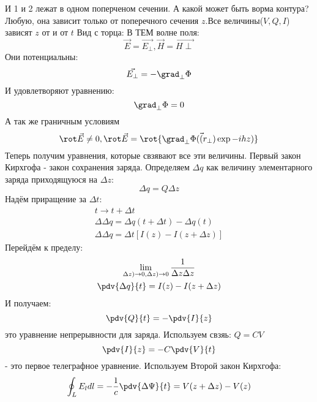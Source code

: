 И 1 и 2 лежат в одном поперченом сечении. А какой может быть ворма контура? Любую, она зависит только от поперечного сечения $z$.Все величины($V, Q, I$) зависят $z$ от и от $t$
%
Вид с торца:
%
В ТЕМ волне поля:
\begin{equation}
	\vec{E} = \vec{E_\perp}, \vec{H} = \vec{H\perp}
\end{equation}
%
Они потенциальны:
\begin{equation}
	\vec{E_\perp} = - \grad_\perp{\Phi}
\end{equation}
%
И удовлетворяют уравнению:
\begin{equation}
	\grad_\perp{\Phi} = 0
\end{equation}
А так же граничным условиям
\begin{equation}
	\rot\vec{E} \neq 0, \rot\vec{E} = \rot{\grad_\perp{\Phi(\vec(r_\perp)\exp{-i h z})}}
\end{equation}
Теперь получим уравнения, которые свзявают все эти величины.
%
Первый закон Кирхгофа - закон сохранения заряда.
%
Определяем $\Delta{q}$ как величину элементарного заряда приходящуюся на $\Delta{z}$:
\begin{equation}
	\Delta{q} = Q \Delta{z}
\end{equation}
%
Надём приращение за $\Delta{t}$:
\begin{gather}
	t \rightarrow t + \Delta{t}\\
	\Delta{\Delta{q}} = \Delta{q(t + \Delta{t})} - \Delta{q(t)}\\
	\Delta{\Delta{q}} = \Delta{t} [I(z) - I(z + \Delta{z})]
\end{gather}
%
Перейдём к пределу:
\begin{gather}
	\lim_{\Delta{z}) \rightarrow 0, \Delta{z}) \rightarrow 0} \frac{1}{\Delta{z} \Delta{z}}\\
	\pdv{\Delta{q}}{t} = I(z) - I(z + \Delta{z})\\
\end{gather}
И получаем:
\begin{equation}
	\pdv{Q}{t} = -\pdv{I}{z}
\end{equation}
%
это уравнение непрерывности для заряда.
%
Используем свзяь: $Q = CV$
\begin{equation}
	\pdv{I}{z} = - C \pdv{V}{t}
\end{equation}
%
- это первое телеграфное уравнение. 
%
Используем Второй закон Кирхгофа:
\begin{equation}
	\oint_{L} E_l dl = - \frac{1}{c} \pdv{\Delta{\Psi}}{t} = V(z + \Delta{z}) - V(z)
\end{equation}
